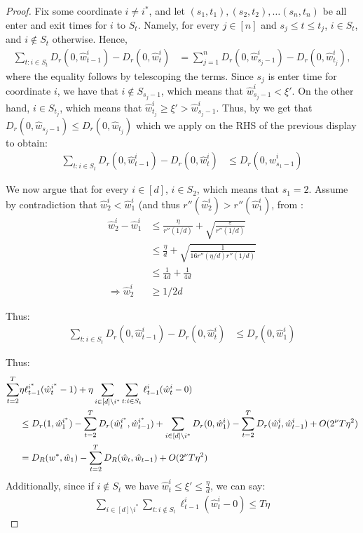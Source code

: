 \documentclass[10pt]{article}
\theoremstyle{definition}
\theoremstyle{remark}
\renewcommand{\epsilon}{\varepsilon}
\newcommand{\barconst}{\nu}
\begin{document}
\begin{proof}
Fix some coordinate $i\ne i^*$, and let $(s_1,t_1),(s_2,t_2),\dots (s_n,t_n)$ be all enter and exit times for $i$ to $S_t$. Namely, for every $j\in[n]$ and $s_j\le t \le t_j$, $i\in S_t$, and $i\notin S_t$ otherwise. 
Hence, 
\begin{align*}
    \sum_{t:i\in S_t}D_r(0, \hat{w}_{t-1}^i) - D_r(0,\hat{w}_t^i) 
    &= 
    \sum_{j=1}^n D_r(0, \hat{w}_{s_j-1}^i) - D_r(0, \hat{w}_{t_j}^i),
\end{align*}
where the equality follows by telescoping the terms.
Since $s_j$ is enter time for coordinate $i$, we have that $i\notin S_{s_j-1}$, which means that $\hat{w}_{s_j-1}^i< \xi'$. On the other hand, $i\in S_{t_j}$, which means that $\hat{w}_{t_j}^i \ge \xi' > \hat{w}_{s_j-1}^i$. 
Thus, by  we get that $D_r(0,\hat{w}_{s_j-1}) \le D_r(0, \hat{w}_{t_{j}})$  which we apply on the RHS of the previous display to obtain:
\begin{align*}
    \sum_{t:i\in S_t}D_r(0, \hat{w}_{t-1}^i) - D_r(0,\hat{w}_t^i) &\le D_r(0, \hat{w}_{s_1-1}^i)
\end{align*}

We now argue that for every $i\in[d]$, $i\in S_2$, which means that $s_1=2$. Assume by contradiction that $\hat{w}_2^i < \hat{w}_1^i$ (and thus $r''(\hat{w}_2^i) > r''(\hat{w}_1^i)$, from :
\begin{align*}
    \hat{w}_2^i -\hat{w}_1^i &\le \frac{\eta}{r''(1/d)} + \sqrt{\frac{\epsilon}{r''(1/d)}}\\
    &\le \frac{\eta}{d} + \sqrt{\frac{1}{16r''(\eta/d)r''(1/d)}}\\
    &\le \frac{1}{4d} + \frac{1}{4d}\\
    \Rightarrow \hat{w}_2^i &\ge 1/2d
\end{align*}

Thus:
\begin{align*}
        \sum_{t:i\in S_t}D_r(0, \hat{w}_{t-1}^i) - D_r(0,\hat{w}_t^i) &\le D_r(0, \hat{w}_{1}^i)
\end{align*}

Thus:
\begin{align}
    \sum_{t=2}^T & \eta\ell_{t-1}^{i^*}(\hat{w}_t^{i^*}-1) + \eta\sum_{i\in [d]\setminus i^*}\sum_{t:i\in S_t}\ell_{t-1}^i(\hat{w}_t^i-0) 
    \notag\\
    &\le D_r(1, \hat{w}_1^{i^*}) - \sum_{t=2}^TD_r(\hat{w}_t^{i^*},\hat{w}_{t-1}^{i^*}) +\sum_{i\in[d]\setminus i^{*}}D_r(0, \hat{w}_1^i) - \sum_{t=2}^TD_r(\hat{w}_t^i,\hat{w}_{t-1}^i)
    + O(2^\barconst T\eta^2)\notag\\
    &= D_R(w^*,\hat{w}_1) - \sum_{t=2}^TD_R(\hat{w}_t,\hat{w}_{t-1})  + O(2^\barconst T\eta^2)\label{eq:in S}
\end{align}
Additionally, since if $i\notin S_t$ we have $\hat{w}_t^i \le \xi' \le \frac{\eta}{d}$, we can say:
\begin{align}\label{eq:non S}
    \sum_{i\in [d]\setminus i^*}\sum_{t:i\notin S_t}\ell_{t-1}^i(\hat{w}_t^i-0) \le T\eta
\end{align}


\end{proof}
\end{document}
